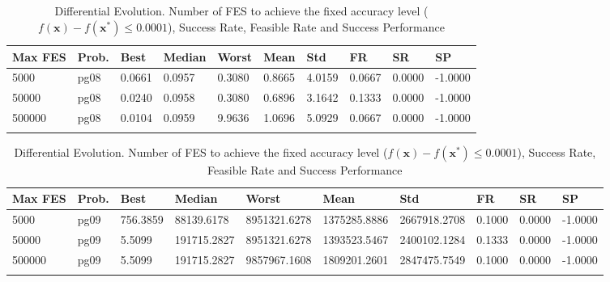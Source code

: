 \documentclass[10pt, a4paper]{book}
\begin{document}
\begin{center}
\begin{longtable}{l l l l l l l l l l}
\textbf{Max FES} & \textbf{Prob.} & \textbf{Best} & \textbf{Median} & \textbf{Worst} & \textbf{Mean} & \textbf{Std} & \textbf{FR} & \textbf{SR} & \textbf{SP} \\
\hline
5000 & pg08 & 0.0661 & 0.0957 & 0.3080 & 0.8665 & 4.0159 & 0.0667 & 0.0000 & -1.0000 \\
50000 & pg08 & 0.0240 & 0.0958 & 0.3080 & 0.6896 & 3.1642 & 0.1333 & 0.0000 & -1.0000 \\
500000 & pg08 & 0.0104 & 0.0959 & 9.9636 & 1.0696 & 5.0929 & 0.0667 & 0.0000 & -1.0000 \\

\caption{ Differential Evolution. Number of FES to achieve the fixed accuracy level ($f(\mathbf{x}) - f(\mathbf{x}^{*}) \leq 0.0001$), Success Rate, Feasible Rate and Success Performance }
\end{longtable}
\end{center}

\begin{center}
\begin{longtable}{l l l l l l l l l l}
\textbf{Max FES} & \textbf{Prob.} & \textbf{Best} & \textbf{Median} & \textbf{Worst} & \textbf{Mean} & \textbf{Std} & \textbf{FR} & \textbf{SR} & \textbf{SP} \\
\hline
5000 & pg09 & 756.3859 & 88139.6178 & 8951321.6278 & 1375285.8886 & 2667918.2708 & 0.1000 & 0.0000 & -1.0000 \\
50000 & pg09 & 5.5099 & 191715.2827 & 8951321.6278 & 1393523.5467 & 2400102.1284 & 0.1333 & 0.0000 & -1.0000 \\
500000 & pg09 & 5.5099 & 191715.2827 & 9857967.1608 & 1809201.2601 & 2847475.7549 & 0.1000 & 0.0000 & -1.0000 \\

\caption{ Differential Evolution. Number of FES to achieve the fixed accuracy level ($f(\mathbf{x}) - f(\mathbf{x}^{*}) \leq 0.0001$), Success Rate, Feasible Rate and Success Performance }
\end{longtable}
\end{center}
\end{document}
